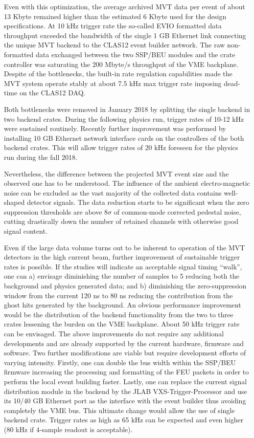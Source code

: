 Even with this optimization, the average archived MVT data per event of about 13 Kbyte remained higher than the 
estimated 6 Kbyte used for the design specifications. At 10 kHz trigger rate the so-called EVIO formatted data 
throughput exceeded the bandwidth of the single 1 GB Ethernet link connecting the unique MVT backend to the CLAS12 
event builder network. The raw non-formatted data exchanged between the two SSP/BEU modules and the crate controller 
was saturating the 200 Mbyte/s throughput of the VME backplane. Despite of the bottlenecks, the built-in rate 
regulation capabilities made the MVT system operate stably at about 7.5 kHz max trigger rate imposing dead-time on the 
CLAS12 DAQ. 

Both bottlenecks were removed in January 2018 by splitting the single backend in two backend crates. During the 
following physics run, trigger rates of 10-12 kHz were sustained routinely. Recently further improvement was performed 
by installing 10 GB Ethernet network interface cards on the controllers of the both backend crates. This will allow 
trigger rates of 20 kHz foreseen for the physics run during the fall 2018.

Nevertheless, the difference between the projected MVT event size and the observed one has to be understood. The 
influence of the ambient electro-magnetic noise can be excluded as the vast majority of the collected data contains 
well-shaped detector signals. The data reduction starts to be significant when the zero suppression thresholds are 
above 8$\sigma$ of common-mode corrected pedestal noise, cutting drastically down the number of retained channels with 
otherwise good signal content.

Even if the large data volume turns out to be inherent to operation of the MVT detectors in the high current beam, 
further improvement of sustainable trigger rates is possible. If the studies will indicate an acceptable signal timing 
“walk”, one can a) envisage diminishing the number of samples to 5 reducing both the background and physics generated 
data; and b) diminishing the zero-suppression window from the current 120 ns to 80 ns reducing the contribution from 
the ghost hits generated by the background. An obvious performance improvement would be the distribution of the backend 
functionality from the two to three crates lessening the burden on the VME backplane. About 50 kHz trigger rate can be 
envisaged. The above improvements do not require any additional developments and are already supported by the current 
hardware, firmware and software. Two further modifications are viable but require development efforts of varying 
intensity. Firstly, one can double the bus width within the SSP/BEU firmware increasing the processing and formatting 
of the FEU packets in order to perform the local event building faster. Lastly, one can replace the current signal 
distribution module in the backend by the JLAB VXS-Trigger-Processor and use its 10/40 GB Ethernet port as the 
interface with the event builder thus avoiding completely the VME bus. This ultimate change would allow the use of 
single backend crate. Trigger rates as high as 65 kHz can be expected and even higher (80 kHz if 4-sample readout is 
acceptable).
